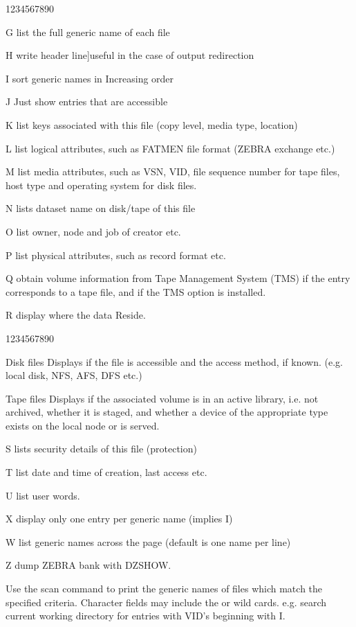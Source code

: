 \begin{DLtt}{1234567890}
\begin{DLtt}{12}
\item[G]list the full generic name of each file
\item[H]write header line]useful in the case of output redirection 
\item[I]sort generic names in Increasing order
\item[J]Just show entries that are accessible
\item[K]list keys associated with this file (copy level, media type, location)
\item[L]list logical attributes, such as FATMEN file format
(ZEBRA exchange etc.)
\item[M]list media attributes, such as VSN, VID, file sequence number for tape
files, host type and operating system for disk files.
\item[N]lists dataset name on disk/tape of this file
\item[O]list owner, node and job of creator etc.
\item[P]list physical attributes, such as record format etc.
\item[Q]obtain volume information from Tape Management System (TMS)
if the entry corresponds to a tape file, and if the TMS
option is installed.
\item[R]display where the data Reside. 
\begin{DLtt}{1234567890}
\item[Disk files]Displays if the file is accessible and the access method, if
known. (e.g. local disk, NFS, AFS, DFS etc.)
\item[Tape files]Displays if the associated volume is in an active library,
i.e. not archived, whether it is staged, and whether a device of the appropriate
type exists on the local node or is served.
\end{DLtt}
\item[S]lists security details of this file (protection)
\item[T]list date and time of creation, last access etc.
\item[U]list user words.
\item[X]display only one entry per generic name (implies I)
\item[W]list generic names across the page (default is one name per line)
\item[Z]dump ZEBRA bank with DZSHOW.
\end{DLtt}
\end{DLtt}
Use the scan command to print the generic names of files which
match the specified criteria. Character fields may include the
\Lit{*} or \Lit{\%} wild cards.
e.g.  search current working directory for entries
\Lit{\#} with VID's beginning with I.

